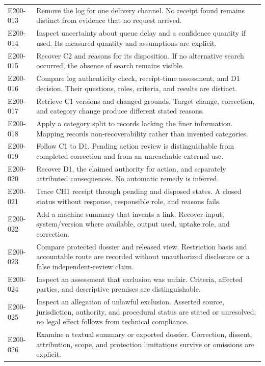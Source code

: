 \documentclass[11pt,a4paper]{article}
\begin{document}
\begin{longtable}{@{}L{0.16\textwidth}L{0.74\textwidth}@{}}
E200-013 & Remove the log for one delivery channel. No receipt found remains distinct from evidence that no request arrived. \\
E200-014 & Inspect uncertainty about queue delay and a confidence quantity if used. Its measured quantity and assumptions are explicit. \\
E200-015 & Recover C2 and reasons for its disposition. If no alternative search occurred, the absence of search remains visible. \\
E200-016 & Compare log authenticity check, receipt-time assessment, and D1 decision. Their questions, roles, criteria, and results are distinct. \\
E200-017 & Retrieve C1 versions and changed grounds. Target change, correction, and category change produce different stated reasons. \\
E200-018 & Apply a category split to records lacking the finer information. Mapping records non-recoverability rather than invented categories. \\
E200-019 & Follow C1 to D1. Pending action review is distinguishable from completed correction and from an unreachable external use. \\
E200-020 & Recover D1, the claimed authority for action, and separately attributed consequences. No automatic remedy is inferred. \\
E200-021 & Trace CH1 receipt through pending and disposed states. A closed status without response, responsible role, and reasons fails. \\
E200-022 & Add a machine summary that invents a link. Recover input, system/version where available, output used, uptake role, and correction. \\
E200-023 & Compare protected dossier and released view. Restriction basis and accountable route are recorded without unauthorized disclosure or a false independent-review claim. \\
E200-024 & Inspect an assessment that exclusion was unfair. Criteria, affected parties, and descriptive premises are distinguishable. \\
E200-025 & Inspect an allegation of unlawful exclusion. Asserted source, jurisdiction, authority, and procedural status are stated or unresolved; no legal effect follows from technical compliance. \\
E200-026 & Examine a textual summary or exported dossier. Correction, dissent, attribution, scope, and protection limitations survive or omissions are explicit. \\

\end{longtable}
\end{document}
